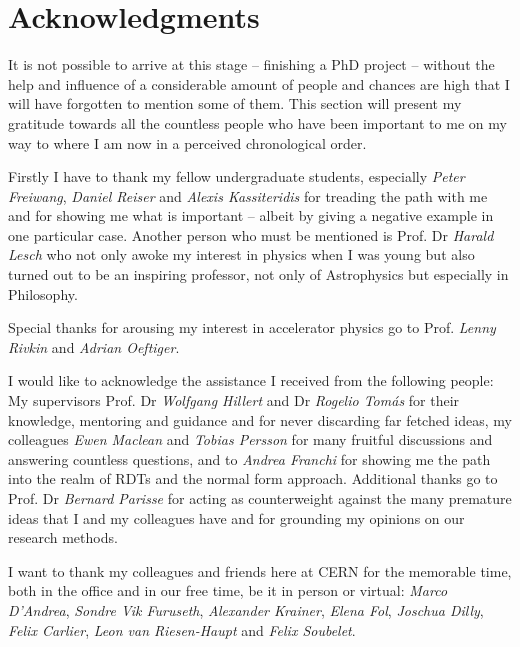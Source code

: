 \section*{Acknowledgments}

It is not possible to arrive at this stage -- finishing a PhD project -- without the help and influence
of a considerable amount of people and chances are high that I will have forgotten to mention some of them.
This section will present my gratitude towards all the countless people who have been important to me
on my way to where I am now in a perceived chronological order.

\vspace{1em}
\noindent Firstly I have to thank my fellow undergraduate students, especially \emph{Peter Freiwang},
\emph{Daniel Reiser} and \emph{Alexis Kassiteridis} for treading the path with me
and for showing me what is important
-- albeit by giving a negative example in one particular case.
Another person who must be mentioned is Prof. Dr \emph{Harald Lesch} who not only awoke my interest in physics
when I was young but also turned out to be an inspiring professor, not only of Astrophysics but
especially in Philosophy.

\noindent Special thanks for arousing my interest in accelerator physics go to Prof. \emph{Lenny Rivkin} and
\emph{Adrian Oeftiger}.

\vspace{1em}
\noindent I would like to acknowledge the assistance I received from the following people:
My supervisors Prof. Dr \emph{Wolfgang Hillert} and Dr \emph{Rogelio Tom\'as} for their
knowledge, mentoring and guidance and for never discarding far fetched ideas,
my colleagues \emph{Ewen Maclean} and \emph{Tobias Persson} for many fruitful discussions
and answering countless questions, and to \emph{Andrea Franchi} for showing me the path into the realm of
RDTs and the normal form approach.
Additional thanks go to Prof. Dr \emph{Bernard Parisse} for acting as counterweight against the
many premature ideas that I and my colleagues have and for grounding my opinions
on our research methods.

\vspace{1em}
\noindent I want to thank my colleagues and friends here at CERN for the memorable time,
both in the office and in our free time, be it in person or virtual:
\emph{Marco D'Andrea},
\emph{Sondre Vik Furuseth},
\emph{Alexander Krainer},
\emph{Elena Fol},
\emph{Joschua Dilly},
\emph{Felix Carlier},
\emph{Leon van Riesen-Haupt}
and
\emph{Felix Soubelet}.

